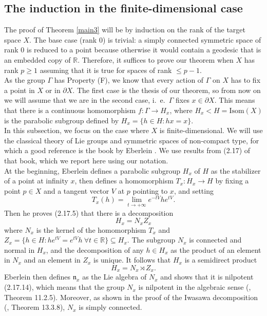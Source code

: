 \documentclass{article}
\theoremstyle{definition}
\theoremstyle{remark}
\theoremstyle{plain}
\begin{document}
\subsection{The induction in the finite-dimensional case}

The proof of Theorem \ref{main3} will be by induction on the rank of the target space $X$. The base case (rank 0) is trivial: a simply connected symmetric space of rank 0 is reduced to a point because otherwise it would contain a geodesic that is an embedded copy of $\mathbb{R}$. Therefore, it suffices to prove our theorem when $X$ has rank $p\geq 1$ assuming that it is true for spaces of rank $\leq p-1$. \\

As the group $\Gamma$ has Property (F), we know that every action of $\Gamma$ on $X$ has to fix a point in $X$ or in $\partial X$. The first case is the thesis of our theorem, so from now on we will assume that we are in the second case, i.~e.~$\Gamma$ fixes $x\in\partial X$. This means that there is a continuous homomorphism $f: \Gamma\rightarrow H_x$, where $H_x<H=\mathrm{Isom}(X)$ is the parabolic subgroup defined by $H_x=\{h\in H: hx=x\}$. \\

In this subsection, we focus on the case where $X$ is finite-dimensional. We will use the classical theory of Lie groups and symmetric spaces of non-compact type, for which a good reference is the book by Eberlein \cite{eberlein}. We use results from (2.17) of that book, which we report here using our notation. \\

At the beginning, Eberlein defines a parabolic subgroup $H_x$ of $H$ as the stabilizer of a point at infinity $x$, then defines a homomorphism $T_x: H_x\rightarrow H$ by fixing a point $p\in X$ and a tangent vector $V$ at $p$ pointing to $x$, and setting $$T_x(h)=\lim_{t\rightarrow +\infty}{e^{-tV}he^{tV}}.$$ Then he proves (2.17.5) that there is a decomposition $$H_x=N_x Z_x$$ where $N_x$ is the kernel of the homomorphism $T_x$ and $Z_x=\{h\in H: he^{tV}=e^{tV}h\ \forall t\in\mathbb{R}\}\subseteq H_x$. The subgroup $N_x$ is connected and normal in $H_x$, and the decomposition of any $h\in H_x$ as the product of an element in $N_x$ and an element in $Z_x$ is unique. It follows that $H_x$ is a semidirect product $$H_x=N_x\rtimes Z_x.$$ Eberlein then defines $\mathfrak{n}_x$ as the Lie algebra of $N_x$ and shows that it is nilpotent (2.17.14), which means that the group $N_x$ is nilpotent in the algebraic sense (\cite{hilneeb}, Theorem 11.2.5). Moreover, as shown in the proof of the Iwasawa decomposition (\cite{hilneeb}, Theorem 13.3.8), $N_x$ is simply connected. \\
\end{document}
